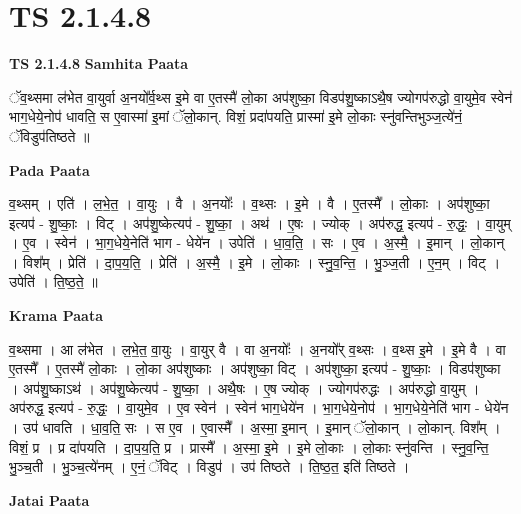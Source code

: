 \documentclass[17pt]{extarticle}
\begin{document}
\section{ TS 2.1.4.8 }

\textbf{TS 2.1.4.8 } \newline
\textbf{Samhita Paata} \newline

ॅव॒थ्समा ल॑भेत वा॒युर्वा अ॒नयो᳚र्व॒थ्स इ॒मे वा ए॒तस्मै॑ लो॒का अप॑शुष्का॒ विडप॑शु॒ष्काऽथै॒ष ज्योगप॑रुद्धो वा॒युमे॒व स्वेन॑ भाग॒धेये॒नोप॑ धावति॒ स ए॒वास्मा॑ इ॒मां ॅलो॒कान्. विशं॒ प्रदा॑पयति॒ प्रास्मा॑ इ॒मे लो॒काः स्नु॑वन्तिभुञ्ज॒त्ये॑नं॒ ॅविडुप॑तिष्ठते ॥ \newline

\textbf{Pada Paata} \newline

व॒थ्सम् । एति॑ । ल॒भे॒त॒ । वा॒युः । वै । अ॒नयोः᳚ । व॒थ्सः । इ॒मे । वै । ए॒तस्मै᳚ । लो॒काः । अप॑शुष्का॒ इत्यप॑ - शु॒ष्काः॒ । विट् । अप॑शु॒ष्केत्यप॑ - शु॒ष्का॒ । अथ॑ । ए॒षः । ज्योक् । अप॑रुद्ध॒ इत्यप॑ - रु॒द्धः॒ । वा॒युम् । ए॒व । स्वेन॑ । भा॒ग॒धेये॒नेति॑ भाग - धेये॑न । उपेति॑ । धा॒व॒ति॒ । सः । ए॒व । अ॒स्मै॒ । इ॒मान् । लो॒कान् । विश᳚म् । प्रेति॑ । दा॒प॒य॒ति॒ । प्रेति॑ । अ॒स्मै॒ । इ॒मे । लो॒काः । स्नु॒व॒न्ति॒ । भु॒ञ्ज॒ती । ए॒न॒म् । विट् । उपेति॑ । ति॒ष्ठ॒ते॒ ॥  \newline


\textbf{Krama Paata} \newline

व॒थ्समा । आ ल॑भेत । ल॒भे॒त॒ वा॒युः । वा॒युर् वै । वा अ॒नयोः᳚ । अ॒नयो᳚र् व॒थ्सः । व॒थ्स इ॒मे । इ॒मे वै । वा ए॒तस्मै᳚ । ए॒तस्मै॑ लो॒काः । लो॒का अप॑शुष्काः । अप॑शुष्का॒ विट् । अप॑शुष्का॒ इत्यप॑ - शु॒ष्काः॒ । विडप॑शुष्का । अप॑शु॒ष्काऽथ॑ । अप॑शु॒ष्केत्यप॑ - शु॒ष्का॒ । अथै॒षः । ए॒ष ज्योक् । ज्योगप॑रुद्धः । अप॑रुद्धो वा॒युम् । अप॑रुद्ध॒ इत्यप॑ - रु॒द्धः॒ । वा॒युमे॒व । ए॒व स्वेन॑ । स्वेन॑ भाग॒धेये॑न । भा॒ग॒धेये॒नोप॑ । भा॒ग॒धेये॒नेति॑ भाग - धेये॑न । उप॑ धावति । धा॒व॒ति॒ सः । स ए॒व । ए॒वास्मै᳚ । अ॒स्मा॒ इ॒मान् । इ॒मान् ॅलो॒कान् । लो॒कान्. विश᳚म् । विशं॒ प्र । प्र दा॑पयति । दा॒प॒य॒ति॒ प्र । प्रास्मै᳚ । अ॒स्मा॒ इ॒मे । इ॒मे लो॒काः । लो॒काः स्नु॑वन्ति । स्नु॒व॒न्ति॒ भु॒ञ्च॒ती । भु॒ञ्च॒त्ये॑नम् । ए॒नं॒ ॅविट् । विडुप॑ । उप॑ तिष्ठते । ति॒ष्ठ॒त॒ इति॑ तिष्ठते । \newline

\textbf{Jatai Paata} \newline
\end{document}
